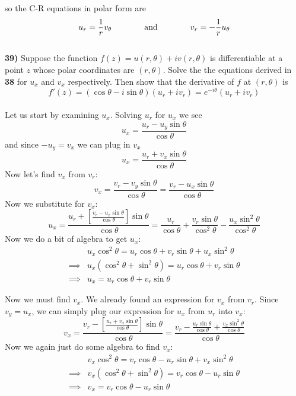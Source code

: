 \documentclass{scrartcl}
\begin{document}
so the C-R equations in polar form are $$u_r = \frac{1}{r}v_\theta \text{\hspace{0.5in} and \hspace{0.5in}} v_r = -\frac{1}{r}u_\theta$$\\

\textbf{39)} Suppose the function $f(z) = u(r,\theta) + iv(r,\theta)$ is differentiable at a point $z$ whose polar coordinates are $(r,\theta)$. Solve the the equations derived in \textbf{38} for $u_x$ and $v_x$ respectively. Then show that the derivative of $f$ at $(r,\theta)$ is
$$f'(z) = (\cos\theta-i\sin\theta)\left(u_r+iv_r\right)=e^{-i\theta}\left(u_r+iv_r\right)$$\\

Let us start by examining $u_x$. Solving $u_r$ for $u_x$ we see $$u_x = \frac{u_r - u_y\sin\theta}{\cos\theta}$$ and since $-u_y=v_x$ we can plug in $v_x$
$$u_x = \frac{u_r + v_x\sin\theta}{\cos\theta}$$ Now let's find $v_x$ from $v_r$:
$$v_x = \frac{v_r - v_y\sin\theta}{\cos\theta} = \frac{v_r - u_x\sin\theta}{\cos\theta}$$
Now we substitute for $v_x$:
$$u_x = \frac{u_r + \left[\frac{v_r - u_x\sin\theta}{\cos\theta}\right]\sin\theta}{\cos\theta} = \frac{u_r}{\cos\theta} + \frac{v_r\sin\theta}{\cos^2\theta} - \frac{u_x\sin^2\theta}{\cos^2\theta}$$
Now we do a bit of algebra to get $u_x$:
\begin{align*}
  &u_x\cos^2\theta = u_r\cos\theta + v_r\sin\theta + u_x\sin^2\theta\\
  \implies& u_x\left(\cos^2\theta + \sin^2\theta\right) = u_r\cos\theta + v_r\sin\theta\\
  \implies& u_x = u_r\cos\theta + v_r\sin\theta
\end{align*}

Now we must find $v_x$. We already found an expression for $v_x$ from $v_r$. Since $v_y = u_x$, we can simply plug our expression for $u_x$ from $u_r$ into $v_x$:
$$v_x = \frac{v_r - \left[\frac{u_r + v_x\sin\theta}{\cos\theta}\right]\sin\theta}{\cos\theta} = \frac{v_r - \frac{u_r\sin\theta}{\cos\theta} + \frac{v_x\sin^2\theta}{\cos\theta}}{\cos\theta}$$
Now we again just do some algebra to find $v_x$:
\begin{align*}
  &v_x\cos^2\theta = v_r\cos\theta - u_r\sin\theta + v_x\sin^2\theta\\
  \implies& v_x\left(\cos^2\theta + \sin^2\theta\right) = v_r\cos\theta - u_r\sin\theta\\
  \implies& v_x = v_r\cos\theta - u_r\sin\theta
\end{align*}
\end{document}
